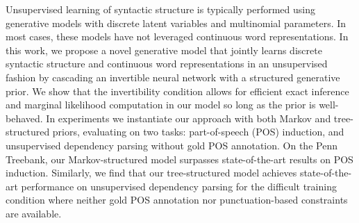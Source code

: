 Unsupervised learning of syntactic structure is typically performed using generative models with discrete latent variables and multinomial parameters. In most cases, these models have not leveraged continuous word representations. In this work, we propose a novel generative model that jointly learns discrete syntactic structure and continuous word representations in an unsupervised fashion by cascading an invertible neural network with a structured generative prior. We show that the invertibility condition allows for efficient exact inference and marginal likelihood computation in our model so long as the prior is well-behaved. In experiments we instantiate our approach with both Markov and tree-structured priors, evaluating on two tasks: part-of-speech (POS) induction, and unsupervised dependency parsing without gold POS annotation. On the Penn Treebank, our Markov-structured model surpasses state-of-the-art results on POS induction. Similarly, we find that our tree-structured model achieves state-of-the-art performance on unsupervised dependency parsing for the difficult training condition where neither gold POS annotation nor punctuation-based constraints are available.
